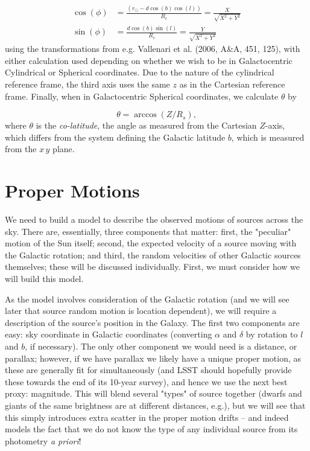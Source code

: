 \documentclass[fleqn,usenatbib]{mnras}
\begin{document}
\begin{align}
    \cos(\phi) &= \frac{(r_\odot - d \cos(b) \cos(l))}{R_c} = \frac{X}{\sqrt{X^2 + Y^2}} \\
    \sin(\phi) &= \frac{d \cos(b)\sin(l)}{R_c} = \frac{Y}{\sqrt{X^2 + Y^2}}
    \label{eq:cossinphi}
\end{align}
using the transformations from e.g. Vallenari et al. (2006, A\&A, 451, 125), with either calculation used depending on whether we wish to be in Galactocentric Cylindrical or Spherical coordinates. Due to the nature of the cylindrical reference frame, the third axis uses the same $z$ as in the Cartesian reference frame. Finally, when in Galactocentric Spherical coordinates, we calculate $\theta$ by

\begin{equation}
    \theta = \arccos(Z / R_s),
\end{equation}
where $\theta$ is the \textit{co-latitude}, the angle as measured from the Cartesian $Z$-axis, which differs from the system defining the Galactic latitude $b$, which is measured from the $x\,y$ plane.

\section{Proper Motions}
We need to build a model to describe the observed motions of sources across the sky. There are, essentially, three components that matter: first, the "peculiar" motion of the Sun itself; second, the expected velocity of a source moving with the Galactic rotation; and third, the random velocities of other Galactic sources themselves; these will be discussed individually. First, we must consider how we will build this model.

As the model involves consideration of the Galactic rotation (and we will see later that source random motion is location dependent), we will require a description of the source's position in the Galaxy. The first two components are easy: sky coordinate in Galactic coordinates (converting $\alpha$ and $\delta$ by rotation to $l$ and $b$, if necessary). The only other component we would need is a distance, or parallax; however, if we have parallax we likely have a unique proper motion, as these are generally fit for simultaneously (and LSST should hopefully provide these towards the end of its 10-year survey), and hence we use the next best proxy: magnitude. This will blend several "types" of source together (dwarfs and giants of the same brightness are at different distances, e.g.), but we will see that this simply introduces extra scatter in the proper motion drifts -- and indeed models the fact that we do not know the type of any individual source from its photometry \textit{a priori}!
\end{document}
